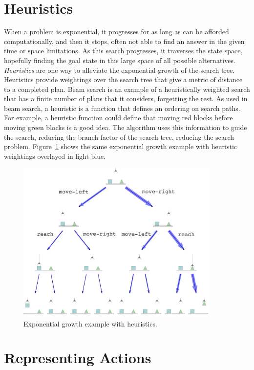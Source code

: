 \section{Heuristics}

When a problem is exponential, it progresses for as long as can be
afforded computationally, and then it stops, often not able to find an
answer in the given time or space limitations.  As this search
progresses, it traverses the state space, hopefully finding the goal
state in this large space of all possible alternatives.
\emph{Heuristics} are one way to alleviate the exponential growth of
the search tree.  Heuristics provide weightings over the search tree
that give a metric of distance to a completed plan.  Beam search is an
example of a heuristically weighted search that has a finite number of
plans that it considers, forgetting the rest.  As used in beam search,
a heuristic is a function that defines an ordering on search paths.
For example, a heuristic function could define that moving red blocks
before moving green blocks is a good idea.  The algorithm uses this
information to guide the search, reducing the branch factor of the
search tree, reducing the search problem.
Figure~\ref{figure:combinatorial_explosion_example_with_heuristics}
shows the same exponential growth example with heuristic weightings
overlayed in light blue.
\begin{figure}
\center
\includegraphics[width=10cm]{gfx/combinatorial_explosion_example_with_heuristics}
\caption{Exponential growth example with heuristics.}
\label{figure:combinatorial_explosion_example_with_heuristics}
\end{figure}

\section{Representing Actions}

